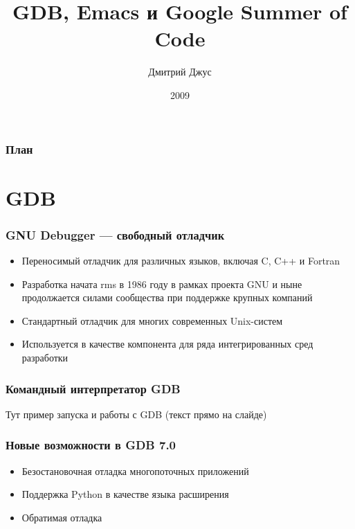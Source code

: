 \documentclass[onlymath]{beamer}
\title{GDB, Emacs и Google Summer of Code }
\author{Дмитрий Джус}
\institute{МГТУ им. Н.Э.Баумана}
\date{2009}
\begin{document}
\begin{frame}
  \titlepage
\end{frame}

\begin{frame}
  \frametitle{План}
  \tableofcontents
\end{frame}

\section{GDB}
\begin{frame}
  \frametitle{GNU Debugger — свободный отладчик}

  \begin{itemize}
  \item Переносимый отладчик для различных языков, включая C, C++ и Fortran
  \item Разработка начата rms в 1986 году в рамках проекта GNU и ныне
    продолжается силами сообщества при поддержке крупных компаний
  \item Стандартный отладчик для многих современных Unix-систем
  \item Используется в качестве компонента для ряда интегрированных
    сред разработки
  \end{itemize}
\end{frame}

\begin{frame}
  \frametitle{Командный интерпретатор GDB}
  Тут пример запуска и работы с GDB (текст прямо на слайде)
\end{frame}

\begin{frame}
  \frametitle{Новые возможности в GDB 7.0}
  \begin{itemize}
  \item Безостановочная отладка многопоточных приложений

  \item Поддержка Python в качестве языка расширения

  \item Обратимая отладка
  \end{itemize}
\end{frame}
\end{document}

